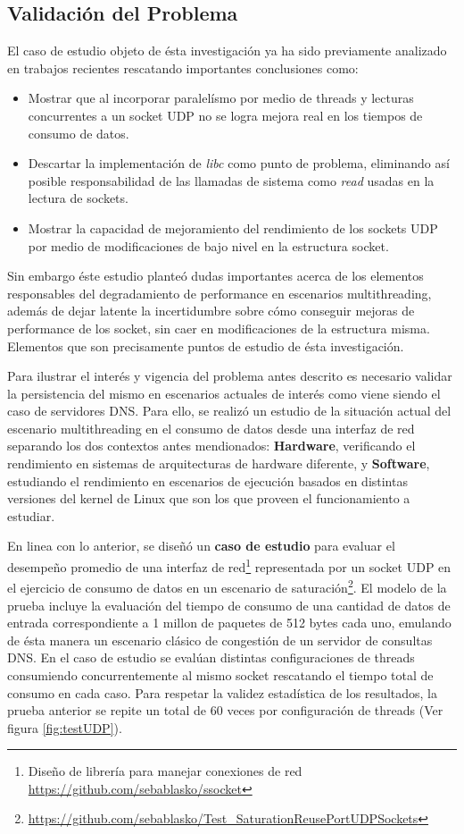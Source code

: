 \subsection{Validación del Problema}

El caso de estudio objeto de ésta investigación ya ha sido previamente analizado en trabajos recientes \cite{tesis:diegoDCC} rescatando importantes conclusiones como:
\begin{itemize}
\item Mostrar que al incorporar paralelísmo por medio de threads y lecturas concurrentes a un socket UDP no se logra mejora real en los tiempos de consumo de datos.
\item Descartar la implementación de \emph{libc} como punto de problema, eliminando así posible responsabilidad de las llamadas de sistema como \emph{read} usadas en la lectura de sockets.
\item Mostrar la capacidad de mejoramiento del rendimiento de los sockets UDP por medio de modificaciones de bajo nivel en la estructura socket.
\end{itemize}

Sin embargo éste estudio planteó dudas importantes acerca de los elementos responsables del degradamiento de performance en escenarios multithreading, además de dejar latente la incertidumbre sobre cómo conseguir mejoras de performance de los socket, sin caer en modificaciones de la estructura misma. Elementos que son precisamente puntos de estudio de ésta investigación.

Para ilustrar el interés y vigencia del problema antes descrito es necesario validar la persistencia del mismo en escenarios actuales de interés como viene siendo el caso de servidores DNS. Para ello, se realizó un estudio de la situación actual del escenario multithreading en el consumo de datos desde una interfaz de red separando los dos contextos antes mendionados: \textbf{Hardware}, verificando el rendimiento en sistemas de arquitecturas de hardware diferente, y \textbf{Software}, estudiando el rendimiento en escenarios de ejecución basados en distintas versiones del kernel de Linux que son los que proveen el funcionamiento a estudiar.

En linea con lo anterior, se diseñó un \textbf{caso de estudio} para evaluar el desempeño promedio de una interfaz de red\footnote{Diseño de librería para manejar conexiones de red \url{https://github.com/sebablasko/ssocket}} representada por un socket UDP en el ejercicio de consumo de datos en un escenario de saturación\footnote{\url{https://github.com/sebablasko/Test_SaturationReusePortUDPSockets}}. El modelo de la prueba incluye la evaluación del tiempo de consumo de una cantidad de datos de entrada correspondiente a 1 millon de paquetes de 512 bytes cada uno, emulando de ésta manera un escenario clásico de congestión de un servidor de consultas DNS. En el caso de estudio se evalúan distintas configuraciones de threads consumiendo concurrentemente al mismo socket rescatando el tiempo total de consumo en cada caso. Para respetar la validez estadística de los resultados, la prueba anterior se repite un total de 60 veces por configuración de threads (Ver figura \ref{fig:testUDP}).

